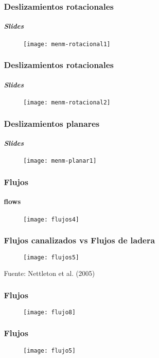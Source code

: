 \documentclass[12pt]{beamer}
\begin{document}
\begin{frame}
\frametitle{Deslizamientos rotacionales}
\framesubtitle{\emph{Slides}}
\begin{figure}
\centering
\texttt{[image: menm-rotacional1]} 
\end{figure}
\end{frame}
\begin{frame}
\frametitle{Deslizamientos rotacionales}
\framesubtitle{\emph{Slides}}
\begin{figure}
\centering
\texttt{[image: menm-rotacional2]} 
\end{figure}
\end{frame}
\begin{frame}
\frametitle{Deslizamientos planares}
\framesubtitle{\emph{Slides}}
\begin{figure}
\centering
\texttt{[image: menm-planar1]} 
\end{figure}
\end{frame}
\begin{frame}
\frametitle{Flujos}
\framesubtitle{flows}
\begin{figure}
\centering
\texttt{[image: flujos4]} 
\end{figure}
\end{frame}
\begin{frame}
\frametitle{Flujos canalizados vs Flujos de ladera}
\begin{figure}
\centering
\texttt{[image: flujos5]} 
\end{figure}
\tiny{Fuente: Nettleton et al. (2005) }
\end{frame}
\begin{frame}
\frametitle{Flujos}
\begin{figure}
\centering
\texttt{[image: flujo8]} 
\end{figure}
\end{frame}
\begin{frame}
\frametitle{Flujos}
\begin{figure}
\centering
\texttt{[image: flujo5]} 
\end{figure}
\end{frame}
\end{document}
